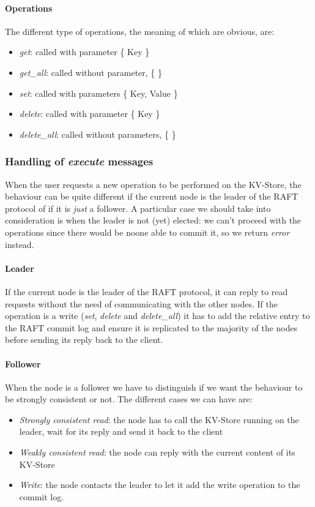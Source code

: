 \documentclass[a4paper]{article}
\begin{document}
\paragraph{Operations}
The different type of operations, the meaning of which are obvious, are:
\begin{itemize}
  \item{\emph{get}}: called with parameter \{ Key \}
  \item{\emph{get\_all}}: called without parameter, \{ \}
  \item{\emph{set}}: called with parameters \{ Key, Value \}
  \item{\emph{delete}}: called with parameter \{ Key \}
  \item{\emph{delete\_all}}: called without parameters, \{ \}
\end{itemize}

\subsubsection{Handling of \emph{execute} messages}
When the user requests a new operation to be performed on the KV-Store, the behaviour can be quite different if the current node is the leader of the RAFT protocol of if it is \emph{just} a follower.
A particular case we should take into consideration is when the leader is not (yet) elected: we can't proceed with the operations since there would be noone able to commit it, so we return \emph{error} instead.

\paragraph{Leader}
If the current node is the leader of the RAFT protocol, it can reply to read requests without the need of communicating with the other nodes.
If the operation is a write (\emph{set}, \emph{delete} and \emph{delete\_all}) it has to add the relative entry to the RAFT commit log and ensure it is replicated to the majority of the nodes before sending its reply back to the client.

\paragraph{Follower}
When the node is a follower we have to distinguish if we want the behaviour to be strongly consistent or not. The different cases we can have are:
\begin{itemize}
  \item{\emph{Strongly consistent read}}: the node has to call the KV-Store running on the leader, wait for its reply and send it back to the client
  \item{\emph{Weakly consistent read}}: the node can reply with the current content of its KV-Store 
  \item{\emph{Write}}: the node contacts the leader to let it add the write operation to the commit log.
\end{itemize}
\end{document}
